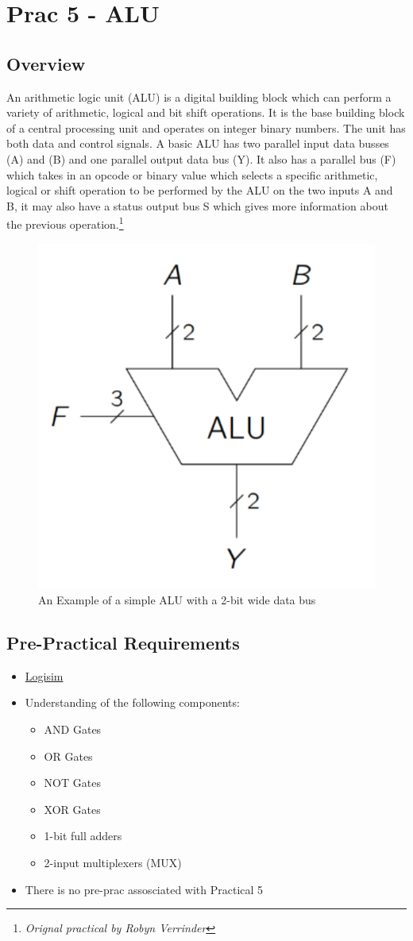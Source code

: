 \newpage
\section{Prac 5 - ALU}
\label{sec:Prac5}
\subsection{Overview}
An arithmetic logic unit (ALU) is a digital building block which can perform a variety of arithmetic, logical and bit shift operations. It is the base building block of a central processing unit and operates on integer binary numbers. The unit has both data and control signals. A basic ALU has two parallel input data busses (A) and (B) and one parallel output data bus (Y). It also has a parallel bus (F) which takes in an opcode or binary value which selects a specific arithmetic, logical or shift operation to be performed by the ALU on the two inputs A and B, it may also have a status output bus S which gives more information about the previous operation.\footnote{\textit{Orignal practical by Robyn Verrinder}}
\begin{figure}[H]
\centering
\includegraphics[width=0.35\columnwidth]{Figures/ALU}
\caption{An Example of a simple ALU with a 2-bit wide data bus}
\label{fig:ALU}
\end{figure}

\subsection{Pre-Practical Requirements}
\begin{itemize}
    \item \href{http://www.cburch.com/logisim/}{Logisim}
    \item Understanding of the following components:
    \begin{itemize}
        \item AND Gates 
        \item OR Gates
        \item NOT Gates
        \item XOR Gates 
        \item 1-bit full adders 
        \item 2-input multiplexers (MUX)
    \end{itemize}
    \item There is no pre-prac assosciated with Practical 5
\end{itemize}

